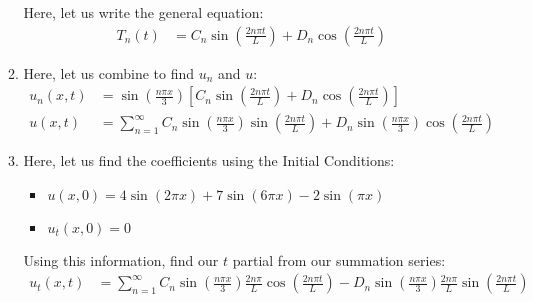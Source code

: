 \documentclass{article}
\begin{document}
\begin{enumerate}
\begin{enumerate}
     Here, let us write the general equation:
     \begin{align}
       T_n(t) & = C_n \sin\left( \frac{2 n \pi t}{L} \right) + D_n \cos \left( \frac{2 n \pi t}{L} \right)
     \end{align}

     \item Here, let us combine to find $u_n$ and $u$:
     \begin{align}
       u_n(x, t) & =
       \sin\left( \frac{n \pi x}{3} \right)
       \left[
       C_n \sin \left( \frac{2 n \pi t}{L} \right) +
       D_n \cos \left( \frac{2 n \pi t}{L} \right)
       \right]\\
       u(x, t) & =
       \sum^\infty_{n = 1}
       C_n
       \sin \left( \frac{n \pi x}{3} \right)
       \sin \left( \frac{2 n \pi t}{L} \right) +
       D_n
       \sin \left( \frac{n \pi x}{3} \right)
       \cos \left( \frac{2 n \pi t}{L} \right)
     \end{align}

     \item Here, let us find the coefficients using the Initial Conditions:
     \begin{itemize}
       \item
       $u(x, 0) =
       4 \sin ( 2 \pi x ) +
       7 \sin ( 6 \pi x ) -
       2 \sin( \pi x )$
       \item $u_t(x, 0) = 0$
     \end{itemize}

     Using this information, find our $t$ partial from our summation series:
     \begin{align}
       u_t(x, t) & =
       \sum^\infty_{n = 1}
       C_n
       \sin \left( \frac{n \pi x}{3} \right)
       \frac{2 n \pi}{L}
       \cos \left( \frac{2 n \pi t}{L} \right) -
       D_n
       \sin \left( \frac{n \pi x}{3} \right)
       \frac{2 n \pi}{L}
       \sin \left( \frac{2 n \pi t}{L} \right)
     \end{align}




\end{enumerate}
\end{enumerate}
\end{document}
